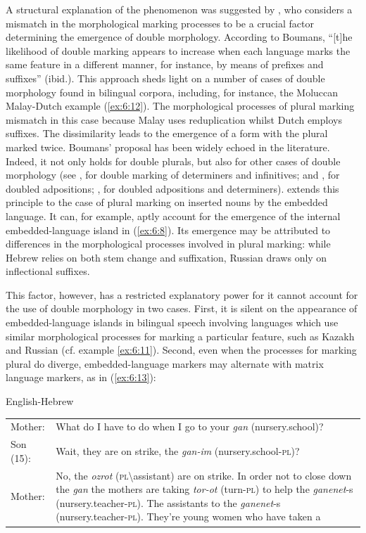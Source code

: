 A structural explanation of the phenomenon was suggested by \cite[][91]{boumans-syntax-1998}, who considers a mismatch in the morphological marking processes to be a crucial factor determining the emergence of double morphology. According to Boumans, ``[t]he likelihood of double marking appears to increase when each language marks the same feature in a different manner, for instance, by means of prefixes and suffixes'' (ibid.). This approach sheds light on a number of cases of double morphology found in bilingual corpora, including, for instance, the Moluccan Malay-Dutch example (\ref{ex:6:12}). The morphological processes of plural marking mismatch in this case because Malay uses reduplication whilst Dutch employs suffixes. The dissimilarity leads to the emergence of a form with the plural marked twice. Boumans' proposal has been widely echoed in the literature. Indeed, it not only holds for double plurals, but also for other cases of double morphology (see \citealt[91]{myers-scotton-contact-2002}, for double marking of determiners and infinitives; \citealt[104]{muysken-bilingual-2000} and \citealt[152--156]{muhamedowa-untersuchung-2006}, for doubled adpositions; \citealt[346--352]{szabo-language-2010}, for doubled adpositions and determiners). \cite[150]{myers-scotton-contact-2002} extends this principle to the case of plural marking on inserted nouns by the embedded language. It can, for example, aptly account for the emergence of the internal embedded-language island in (\ref{ex:6:8}). Its emergence may be attributed to differences in the morphological processes involved in plural marking: while Hebrew relies on both stem change and suffixation, Russian draws only on inflectional suffixes.

This factor, however, has a restricted explanatory power for it cannot account for the use of double morphology in two cases. First, it is silent on the appearance of embedded-language islands in bilingual speech involving languages which use similar morphological processes for marking a particular feature, such as Kazakh and Russian (cf. example \ref{ex:6:11}). Second, even when the processes for marking plural do diverge, embedded-language markers may alternate with matrix language markers, as in (\ref{ex:6:13}):

\ea
\label{ex:6:13}
English-Hebrew \citep[70]{olshtain-blum}\\
\begin{table}
\begin{tabular}[b!]{p{1.3cm}p{10.3cm}} 
	Mother: & What do I have to do when I go to your \textit{gan} (nursery.school)?\\
	Son (15): & Wait, they are on strike, the \textit{gan-im} (nursery.school\textsc{-pl})? \\
	Mother: & No, the \textit{ozrot} (\textsc{pl}\textbackslash assistant) are on strike. In order not to close down the \textit{gan} the mothers are taking \textit{tor-ot} (turn-\textsc{pl}) to help the \textit{ganenet}-s (nursery.teacher-\textsc{pl}). The assistants to the  \textit{ganenet}-s (nursery.teacher-\textsc{pl}). They're young women who have taken a 
\end{tabular}
\end{table}
\vspace*{5mm}

